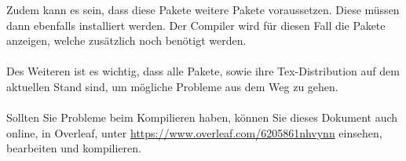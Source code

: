 \documentclass[../thesis.tex]{subfiles}
\begin{document}
Zudem kann es sein, dass diese Pakete weitere Pakete voraussetzen. Diese müssen dann ebenfalls installiert werden. Der Compiler wird für diesen Fall die Pakete
anzeigen, welche zusätzlich noch benötigt werden.\\
\\
Des Weiteren ist es wichtig, dass alle Pakete, sowie ihre Tex-Distribution auf dem aktuellen Stand sind, um mögliche Probleme aus dem Weg zu gehen.\\
\\
Sollten Sie Probleme beim Kompilieren haben, können Sie dieses Dokument auch online, in Overleaf, unter \url{https://www.overleaf.com/6205861nhvynn} einsehen, bearbeiten und kompilieren.




%
%
%
\end{document}
